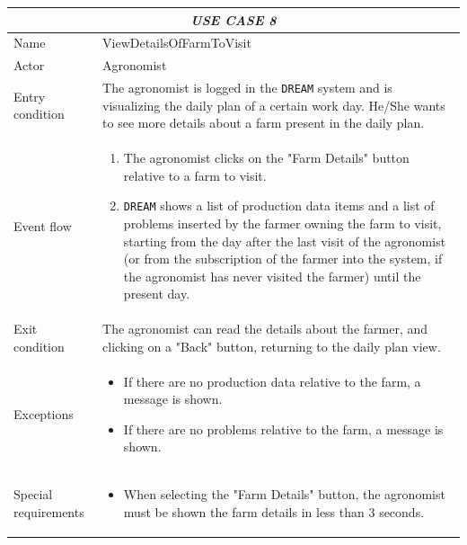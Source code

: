 \documentclass{article}
\begin{document}
\centering
\begin{longtable}{|p{3.5cm}|m{8cm}|}
 \hline
 \multicolumn{2}{|c|}{\cellcolor{white}\emph{USE CASE 8}} \\
 \endfirsthead
 \endhead
 \endfoot
 \endlastfoot
 \hline
 Name & ViewDetailsOfFarmToVisit\\
 \hline
 Actor & Agronomist\\
 \hline
 Entry condition & The agronomist is logged in the \verb|DREAM| system and is visualizing the daily plan of a certain work day. He/She wants to see more details about a farm present in the daily plan.\\
 \hline
 Event flow & \begin{enumerate}
    \item The agronomist clicks on the "Farm Details" button relative to a farm to visit.
    \item \verb|DREAM| shows a list of production data items and a list of problems inserted by the farmer owning the farm to visit, starting from the day after the last visit of the agronomist (or from the subscription of the farmer into the system, if the agronomist has never visited the farmer) until the present day.
 \end{enumerate}\\
 \hline
 Exit condition & The agronomist can read the details about the farmer, and clicking on a "Back" button, returning to the daily plan view.\\
 \hline
 Exceptions & \begin{itemize}
     \item If there are no production data relative to the farm, a message is shown.
     \item If there are no problems relative to the farm, a message is shown.
 \end{itemize}\\
 \hline
 Special requirements &\begin{itemize}
     \item When selecting the "Farm Details" button, the agronomist must be shown the farm details in less than 3 seconds.
 \end{itemize}\\
 \hline
\end{longtable}
\end{document}
